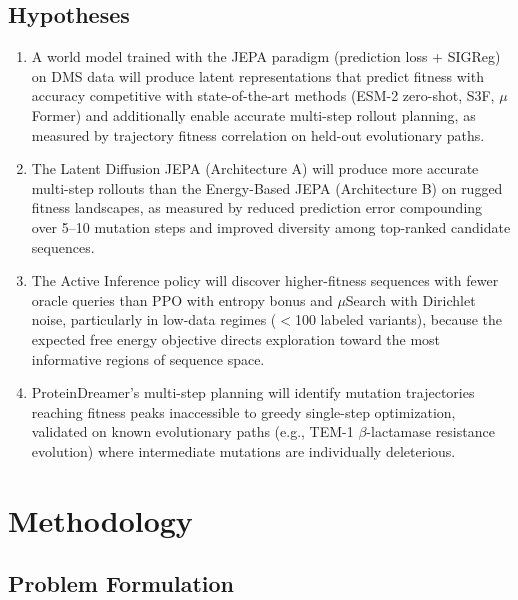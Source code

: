 \documentclass[12pt, a4paper]{article}
\begin{document}
\subsection{Hypotheses}

\begin{enumerate}
    \item[\textbf{H1.}] A world model trained with the JEPA paradigm (prediction loss + SIGReg) on DMS data will produce latent representations that predict fitness with accuracy competitive with state-of-the-art methods (ESM-2 zero-shot, S3F, $\mu$Former) and additionally enable accurate multi-step rollout planning, as measured by trajectory fitness correlation on held-out evolutionary paths.

    \item[\textbf{H2.}] The Latent Diffusion JEPA (Architecture A) will produce more accurate multi-step rollouts than the Energy-Based JEPA (Architecture B) on rugged fitness landscapes, as measured by reduced prediction error compounding over 5--10 mutation steps and improved diversity among top-ranked candidate sequences.

    \item[\textbf{H3.}] The Active Inference policy will discover higher-fitness sequences with fewer oracle queries than PPO with entropy bonus and $\mu$Search with Dirichlet noise, particularly in low-data regimes ($<$100 labeled variants), because the expected free energy objective directs exploration toward the most informative regions of sequence space.

    \item[\textbf{H4.}] ProteinDreamer's multi-step planning will identify mutation trajectories reaching fitness peaks inaccessible to greedy single-step optimization, validated on known evolutionary paths (e.g., TEM-1 $\beta$-lactamase resistance evolution) where intermediate mutations are individually deleterious.
\end{enumerate}


\section{Methodology}
\label{sec:methodology}

\subsection{Problem Formulation}
\end{document}
